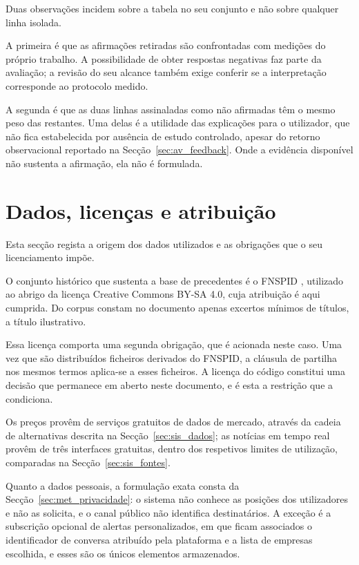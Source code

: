 Duas observações incidem sobre a tabela no seu conjunto e não sobre qualquer linha isolada.

A primeira é que as afirmações retiradas são confrontadas com medições do próprio trabalho.
A possibilidade de obter respostas negativas faz parte da avaliação; a revisão do seu alcance
também exige conferir se a interpretação corresponde ao protocolo medido.

A segunda é que as duas linhas assinaladas como não afirmadas têm o mesmo peso das restantes. Uma
delas é a utilidade das explicações para o utilizador, que não fica estabelecida por ausência
de estudo controlado, apesar do retorno observacional reportado na Secção~\ref{sec:av_feedback}.
Onde a evidência disponível não sustenta a afirmação, ela não é formulada.

\section{Dados, licenças e atribuição}
\label{sec:ap_dados}

Esta secção regista a origem dos dados utilizados e as obrigações que o seu licenciamento impõe.

O conjunto histórico que sustenta a base de precedentes é o \gls{FNSPID}
\autocite{dong2024fnspid}, utilizado ao abrigo da licença Creative Commons BY-SA 4.0, cuja
atribuição é aqui cumprida. Do corpus constam no documento apenas excertos mínimos de títulos, a
título ilustrativo.

Essa licença comporta uma segunda obrigação, que é acionada neste caso. Uma vez que são
distribuídos ficheiros derivados do \gls{FNSPID}, a cláusula de partilha nos mesmos termos aplica-se
a esses ficheiros. A licença do código constitui uma decisão que permanece em aberto neste documento,
e é esta a restrição que a condiciona.

Os preços provêm de serviços gratuitos de dados de mercado, através da cadeia de alternativas
descrita na Secção~\ref{sec:sis_dados}; as notícias em tempo real provêm de três interfaces
gratuitas, dentro dos respetivos limites de utilização, comparadas na Secção~\ref{sec:sis_fontes}.

Quanto a dados pessoais, a formulação exata consta da Secção~\ref{sec:met_privacidade}: o sistema
não conhece as posições dos utilizadores e não as solicita, e o canal público não identifica
destinatários. A exceção é a subscrição opcional de alertas personalizados, em que ficam associados
o identificador de conversa atribuído pela plataforma e a lista de empresas escolhida, e esses são
os únicos elementos armazenados.


